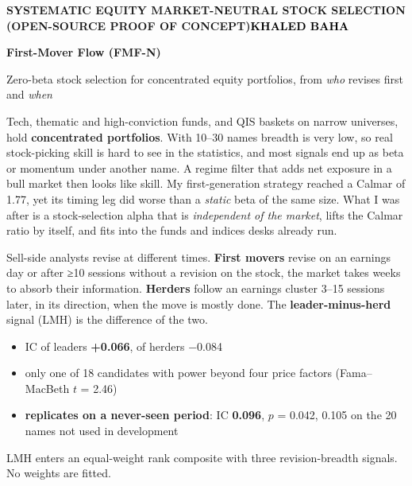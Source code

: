\documentclass[10pt]{article}
\newcommand{\body}{\fontsize{8.4}{10.1}\selectfont}
\newcommand{\head}[2]{\par\vspace{3pt}{\fontsize{9.6}{11}\selectfont\color{fmblue}\textbf{#1}\ifx&#2&\else: #2\fi}\par\vspace{1.5pt}}
\newcommand{\up}[1]{\textcolor{fmblue}{\textbf{#1}}}
\newcommand{\dn}[1]{\textcolor{fmred}{#1}}
\begin{document}
\body
{\fontsize{7.4}{9}\selectfont\color{fmblue}\textbf{SYSTEMATIC EQUITY MARKET-NEUTRAL STOCK SELECTION (OPEN-SOURCE PROOF OF CONCEPT)}\hfill\textcolor{black}{\textbf{KHALED BAHA}}}\par\vspace{2pt}
{\fontsize{19}{21}\selectfont\color{fmblue}\textbf{First-Mover Flow (FMF-N)}}\par\vspace{1pt}
{\fontsize{10.5}{12}\selectfont\color{fmblue}Zero-beta stock selection for concentrated equity portfolios, from \emph{who} revises first and \emph{when}}\par
\vspace{2pt}{\color{fmblue}\rule{\linewidth}{0.6pt}}\par\vspace{2pt}

\begin{minipage}[t]{0.488\linewidth}
\head{THE BUSINESS PROBLEM}{}
Tech, thematic and high-conviction funds, and QIS baskets on narrow universes, hold \textbf{concentrated portfolios}. With 10–30 names breadth is very low, so real stock-picking skill is hard to see in the statistics, and most signals end up as beta or momentum under another name. A regime filter that adds net exposure in a bull market then looks like skill. My first-generation strategy reached a Calmar of 1.77, yet its timing leg did worse than a \emph{static} beta of the same size.
\smallskip
What I was after is a stock-selection alpha that is \emph{independent of the market}, lifts the Calmar ratio by itself, and fits into the funds and indices desks already run.
\end{minipage}\hfill
\begin{minipage}[t]{0.488\linewidth}
\head{THE IDEA}{}
Sell-side analysts revise at different times. \textbf{First movers} revise on an earnings day or after ≥10 sessions without a revision on the stock, the market takes weeks to absorb their information. \textbf{Herders} follow an earnings cluster 3–15 sessions later, in its direction, when the move is mostly done. The \textbf{leader-minus-herd} signal (LMH) is the difference of the two.
\begin{itemize}
\item IC of leaders \up{+0.066}, of herders \dn{−0.084}
\item only one of 18 candidates with power beyond four price factors (Fama–MacBeth $t$ = 2.46)
\item \textbf{replicates on a never-seen period}: IC \up{0.096}, $p$ = 0.042, 0.105 on the 20 names not used in development
\end{itemize}
LMH enters an equal-weight rank composite with three revision-breadth signals. No weights are fitted.
\end{minipage}
\end{document}
